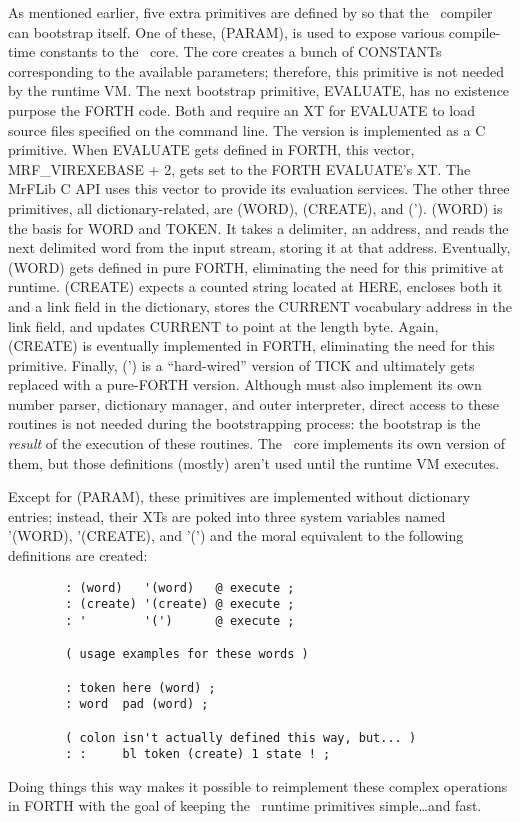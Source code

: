 \documentclass{article}
\begin{document}
As mentioned earlier, five extra primitives are defined by
 so that the \M\ compiler can bootstrap itself.  One of
these, (PARAM), is used to expose various compile-time constants to
the \M\ core. The core creates a bunch of CONSTANTs corresponding to
the available parameters; therefore, this primitive is not needed by
the runtime VM. The next bootstrap primitive, EVALUATE, has no
existence purpose the FORTH code. Both  and
 require an XT for EVALUATE to load source files
specified on the command line. The  version is
implemented as a C primitive. When EVALUATE gets defined in FORTH,
this vector, MRF\_VIREXEBASE + 2, gets set to the FORTH EVALUATE's XT.
The MrFLib C API uses this vector to provide its evaluation services.
The other three primitives, all dictionary-related, are (WORD),
(CREATE), and (').  (WORD) is the basis for WORD and TOKEN. It takes a
delimiter, an address, and reads the next delimited word from the
input stream, storing it at that address. Eventually, (WORD) gets
defined in pure FORTH, eliminating the need for this primitive at
runtime.  (CREATE) expects a counted string located at HERE, encloses
both it and a link field in the dictionary, stores the CURRENT
vocabulary address in the link field, and updates CURRENT to point at
the length byte. Again, (CREATE) is eventually implemented in FORTH,
eliminating the need for this primitive. Finally, (') is a
``hard-wired'' version of TICK and ultimately gets replaced with a
pure-FORTH version. Although  must also implement its
own number parser, dictionary manager, and outer interpreter, direct
access to these routines is not needed during the bootstrapping
process: the bootstrap is the \textit{result} of the execution of
these routines. The \M\ core implements its own version of them, but
those definitions (mostly) aren't used until the runtime VM executes.

Except for (PARAM), these primitives are implemented without
dictionary entries; instead, their XTs are poked into three system
variables named '(WORD), '(CREATE), and '(') and the moral equivalent
to the following definitions are created:
\begin{verbatim}
        : (word)   '(word)   @ execute ;
        : (create) '(create) @ execute ;
        : '        '(')      @ execute ;

        ( usage examples for these words )

        : token here (word) ;
        : word  pad (word) ;

        ( colon isn't actually defined this way, but... )
        : :     bl token (create) 1 state ! ;
\end{verbatim}
Doing things this way makes it possible to reimplement these complex
operations in FORTH with the goal of keeping the \M\ runtime
primitives simple\ldots and fast.
\end{document}
